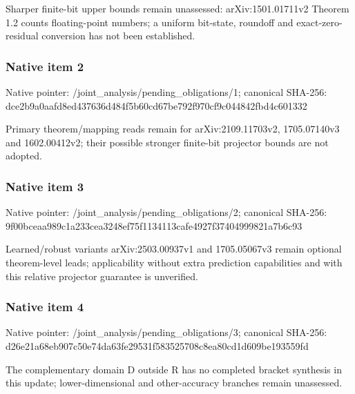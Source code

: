 \documentclass[10pt,a4paper]{article}
\begin{document}
\begingroup\raggedright\sloppy Sharper finite-bit upper bounds remain unassessed:\allowbreak{} arXiv:\allowbreak{}1501.01711v2 Theorem 1.2 counts floating-point numbers;\allowbreak{} a uniform bit-state,\allowbreak{} roundoff and exact-zero-residual conversion has not been established.\par\endgroup

\subsubsection{Native item 2}
Native pointer: /joint\_\allowbreak{}analysis/pending\_\allowbreak{}obligations/1; canonical SHA-256: dce2b9a0aafd8ed437636d484f5b60cd67be792f970cf9c044842fbd4c601332

\begingroup\raggedright\sloppy Primary theorem/\allowbreak{}mapping reads remain for arXiv:\allowbreak{}2109.11703v2,\allowbreak{} 1705.07140v3 and 1602.00412v2;\allowbreak{} their possible stronger finite-bit projector bounds are not adopted.\par\endgroup

\subsubsection{Native item 3}
Native pointer: /joint\_\allowbreak{}analysis/pending\_\allowbreak{}obligations/2; canonical SHA-256: 9f00bceaa989c1a233cea3248ef75f1134113cafe4927f37404999821a7b6c93

\begingroup\raggedright\sloppy Learned/\allowbreak{}robust variants arXiv:\allowbreak{}2503.00937v1 and 1705.05067v3 remain optional theorem-level leads;\allowbreak{} applicability without extra prediction capabilities and with this relative projector guarantee is unverified.\par\endgroup

\subsubsection{Native item 4}
Native pointer: /joint\_\allowbreak{}analysis/pending\_\allowbreak{}obligations/3; canonical SHA-256: d26e21a68eb907c50e74da63fe29531f583525708c8ea80cd1d609be193559fd

\begingroup\raggedright\sloppy The complementary domain D outside R has no completed bracket synthesis in this update;\allowbreak{} lower-dimensional and other-accuracy branches remain unassessed.\par\endgroup
\end{document}
